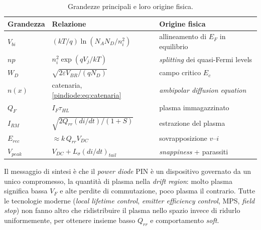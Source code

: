 \begin{table}[htbp]
\centering
\caption{Grandezze principali e loro origine fisica.}
\begin{tabular}{lll}
\toprule
Grandezza & Relazione & Origine fisica \\
\midrule
$V_{bi}$ & $(kT/q)\ln(N_A N_D/n_i^2)$ & allineamento di $E_F$ in equilibrio \\
$np$ & $n_i^2 \exp(qV_j/kT)$ & \emph{splitting} dei quasi-Fermi levels \\
$W_D$ & $\sqrt{2\varepsilon V_{BR}/(qN_D)}$ & campo critico $E_c$ \\
$n(x)$ & catenaria, \eqref{pindiode:eq:catenaria} & \emph{ambipolar diffusion equation} \\
$Q_F$ & $I_F \tau_{HL}$ & plasma immagazzinato \\
$I_{RM}$ & $\sqrt{2 Q_{rr} (di/dt)/(1+S)}$ & estrazione del plasma \\
$E_{rec}$ & $\approx k\, Q_{rr} V_{DC}$ & sovrapposizione $v$--$i$ \\
$V_{peak}$ & $V_{DC} + L_\sigma (di/dt)_{tail}$ & \emph{snappiness} + parassiti \\
\bottomrule
\end{tabular}
\end{table}

Il messaggio di sintesi è che il \emph{power diode} PIN è un dispositivo
governato da un unico compromesso, la quantità di plasma nella
\emph{drift region}: molto plasma significa bassa $V_F$ e alte perdite di
commutazione, poco plasma il contrario. Tutte le tecnologie moderne
(\emph{local lifetime control}, \emph{emitter efficiency control}, MPS,
\emph{field stop}) non fanno altro che ridistribuire il plasma nello spazio
invece di ridurlo uniformemente, per ottenere insieme basso $Q_{rr}$ e
comportamento \emph{soft}.


